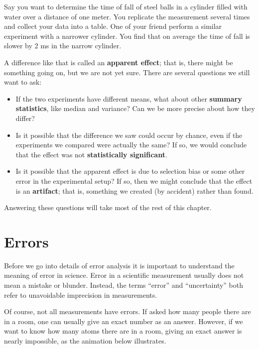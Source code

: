 Say you want to determine the time of fall of steel balls in a cylinder filled with water over a distance of one meter.  You replicate the measurement several times  and collect your data into a table. One of your friend perform a similar experiment with a narrower cylinder. You find that on average the time of fall is slower by 2 ms in the narrow cylinder. 


A difference like that is called an \textbf{apparent effect}; that is,
there might be something going on, but we are not yet sure.  There are
several questions we still want to ask:

\begin{itemize}

\item If the two experiments have different means, what about other 
  \textbf{summary statistics}, like median and variance?  Can we be more
  precise about how they differ?

\item Is it possible that the difference we saw could occur by chance,
  even if the experiments we compared were actually the same?  If so,
  we would conclude that the effect was not \textbf{statistically
    significant}.


\item Is it possible that the apparent effect is due to selection bias or
  some other error in the experimental setup?  If so, then we might
  conclude that the effect is an \textbf{artifact}; that is, something we
  created (by accident) rather than found. 

\end{itemize}

Answering these questions will take most of the rest of this chapter.

\section{Errors}
 Before we go into details of error analysis it is important to understand the meaning of error in science. Error in a scientific measurement usually does not mean a mistake or blunder. Instead, the terms ``error'' and ``uncertainty'' both refer to unavoidable imprecision in measurements.

Of course, not all measurements have errors. If asked how many people there are in a room, one can usually give an exact number as an answer. However, if we want to know how many atoms there are in a room, giving an exact answer is nearly impossible, as the animation below illustrates.

